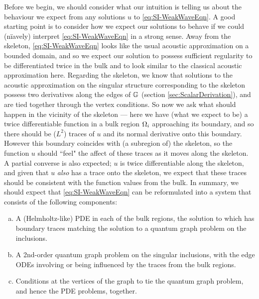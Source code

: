 Before we begin, we should consider what our intuition is telling us about the behaviour we expect from any solutions $u$ to \eqref{eq:SI-WeakWaveEqn}.
A good starting point is to consider how we expect our solutions to behave if we could (n\"{i}avely) interpret \eqref{eq:SI-WeakWaveEqn} in a strong sense.
Away from the skeleton, \eqref{eq:SI-WeakWaveEqn} looks like the usual acoustic approximation on a bounded domain, and so we expect our solution to possess sufficient regularity to be differentiated twice in the bulk and to look similar to the classical acoustic approximation here.
Regarding the skeleton, we know that solutions to the acoustic approximation on the singular structure corresponding to the skeleton possess two derivatives along the edges of $\mathbb{G}$ (section \ref{sec:ScalarDerivation}), and are tied together through the vertex conditions.
So now we ask what should happen in the vicinity of the skeleton --- here we have (what we expect to be) a twice differentiable function in a bulk region $\Omega_i$ approaching its boundary, and so there should be ($L^2$) traces of $u$ and its normal derivative onto this boundary.
However this boundary coincides with (a subregion of) the skeleton, so the function $u$ should ``feel" the affect of these traces as it moves along the skeleton.
A partial converse is also expected; $u$ is twice differentiable along the skeleton, and given that $u$ \emph{also} has a trace onto the skeleton, we expect that these traces should be consistent with the function values from the bulk.
In summary, we should expect that \eqref{eq:SI-WeakWaveEqn} can be reformulated into a system that consists of the following components:
\begin{enumerate}[(a)]
	\item A (Helmholtz-like) PDE in each of the bulk regions, the solution to which has boundary traces matching the solution to a quantum graph problem on the inclusions.
	\item A 2nd-order quantum graph problem on the singular inclusions, with the edge ODEs involving or being influenced by the traces from the bulk regions.
	\item Conditions at the vertices of the graph to tie the quantum graph problem, and hence the PDE problems, together.
\end{enumerate}

